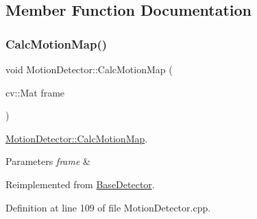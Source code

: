 \subsection{Member Function Documentation}
\mbox{\label{class_motion_detector_aa4e606acafdc33a3104471903e449adc}} 
\subsubsection{\texorpdfstring{Calc\+Motion\+Map()}{CalcMotionMap()}}
{\footnotesize\ttfamily void Motion\+Detector\+::\+Calc\+Motion\+Map (\begin{DoxyParamCaption}\item[{cv\+::\+Mat}]{frame }\end{DoxyParamCaption})\hspace{0.3cm}{\ttfamily [virtual]}}



\mbox{\hyperlink{class_motion_detector_aa4e606acafdc33a3104471903e449adc}{Motion\+Detector\+::\+Calc\+Motion\+Map}}. 


\begin{DoxyParams}{Parameters}
{\em frame} & \\
\hline
\end{DoxyParams}


Reimplemented from \mbox{\hyperlink{class_base_detector_a73c66f0d4dad263fcf65c09a6f6feda2}{Base\+Detector}}.



Definition at line 109 of file Motion\+Detector.\+cpp.


